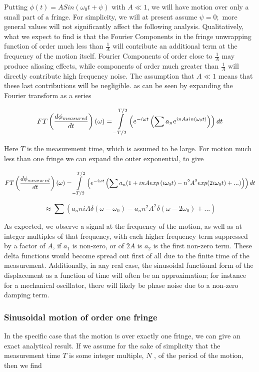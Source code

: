 \documentclass{article}
\begin{document}
Putting $\phi\left(t\right)=ASin\left(\omega_{0}t+\psi\right)$ with
$A\ll1$, we will have motion over only a small part of a fringe.
For simplicity, we will at present assume $\psi=0;$ more general
values will not significantly affect the following analysis. Qualitatively,
what we expect to find is that the Fourier Components in the fringe
unwrapping function of order much less than $\frac{1}{A}$ will contribute
an additional term at the frequency of the motion itself. Fourier
Components of order close to $\frac{1}{A}$ may produce aliasing effects,
while components of order much greater than $\frac{1}{A}$ will directly
contribute high frequency noise. The assumption that $A\ll1$ means
that these last contributions will be negligible. as can be seen by
expanding the Fourier transform as a series

\[
FT\left(\frac{d\phi_{measured}}{dt}\right)(\omega)=\intop_{-T/2}^{T/2}\left(e^{-i\omega t}\left(\sum a_{n}e^{inAsin\left(\omega_{0}t\right)}\right)\right)dt
\]


Here $T$ is the measurement time, which is assumed to be large. For
motion much less than one fringe we can expand the outer exponential,
to give

\[
FT\left(\frac{d\phi_{measured}}{dt}\right)(\omega)=\intop_{-T/2}^{T/2}\left(e^{-i\omega t}\left(\sum a_{n}(1+inAexp\left(i\omega_{0}t\right)-n^{2}A^{2}exp(2i\omega_{0}t)+...)\right)\right)dt
\]


\[
\approx\sum(a_{n}niA\delta\left(\omega-\omega_{0}\right)-a_{n}n^{2}A^{2}\delta\left(\omega-2\omega_{0}\right)+...)
\]


As expected, we observe a signal at the frequency of the motion, as
well as at integer multiples of that frequency, with each higher frequency
term suppressed by a factor of $A$, if $a_{1}$ is non-zero, or of
$2A$ is $a_{2}$ is the first non-zero term. These delta functions
would become spread out first of all due to the finite time of the
measurement. Additionally, in any real case, the sinusoidal functional
form of the displacement as a function of time will often be an approximation;
for instance for a mechanical oscillator, there will likely be phase
noise due to a non-zero damping term.


\subsubsection{Sinusoidal motion of order one fringe}

In the specific case that the motion is over exactly one fringe, we
can give an exact analytical result. If we assume for the sake of
simplicity that the measurement time $T$ is some integer multiple,
$N$ , of the period of the motion, then we find
\end{document}
